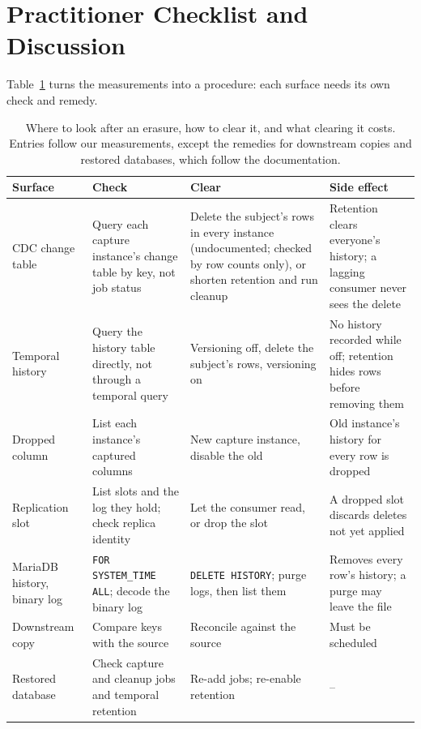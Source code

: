 \documentclass[runningheads]{llncs}
\begin{document}
\section{Practitioner Checklist and Discussion}\label{sec:checklist}

Table~\ref{tab:checklist} turns the measurements into a procedure: each surface
needs its own check and remedy.

\begin{table}[t]
\caption{Where to look after an erasure, how to clear it, and what clearing it
costs. Entries follow our measurements, except the remedies for downstream
copies and restored databases, which follow the documentation.}\label{tab:checklist}
\centering
\footnotesize
\setlength{\tabcolsep}{4pt}
\begin{tabular}{@{}>{\raggedright}p{1.75cm}>{\raggedright}p{3.1cm}>{\raggedright}p{3.1cm}>{\raggedright\arraybackslash}p{3.1cm}@{}}
\toprule
Surface & Check & Clear & Side effect \\
\midrule
CDC change table & Query each capture instance's change table by key, not job status & Delete the subject's rows in every instance (undocumented; checked by row counts only), or shorten retention and run cleanup & Retention clears everyone's history; a lagging consumer never sees the delete \\ \addlinespace[2pt]
Temporal history & Query the history table directly, not through a temporal query & Versioning off, delete the subject's rows, versioning on & No history recorded while off; retention hides rows before removing them \\ \addlinespace[2pt]
Dropped column & List each instance's captured columns & New capture instance, disable the old & Old instance's history for every row is dropped \\ \addlinespace[2pt]
Replication slot & List slots and the log they hold; check replica identity & Let the consumer read, or drop the slot & A dropped slot discards deletes not yet applied \\ \addlinespace[2pt]
MariaDB history, binary log & \texttt{FOR SYSTEM\_TIME ALL}; decode the binary log & \texttt{DELETE HISTORY}; purge logs, then list them & Removes every row's history; a purge may leave the file \\ \addlinespace[2pt]
Downstream copy & Compare keys with the source & Reconcile against the source & Must be scheduled \\ \addlinespace[2pt]
Restored database & Check capture and cleanup jobs and temporal retention & Re-add jobs; re-enable retention & -- \\
\bottomrule
\end{tabular}
\end{table}
\end{document}
